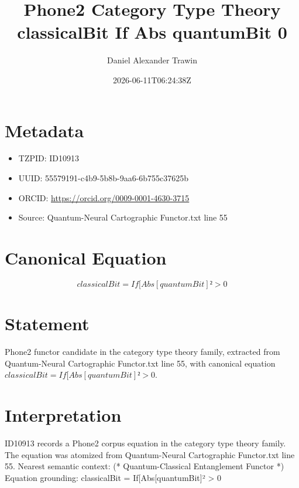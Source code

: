 \documentclass[11pt]{article}
\title{Phone2 Category Type Theory classicalBit If Abs quantumBit 0}
\author{Daniel Alexander Trawin}
\date{2026-06-11T06:24:38Z}
\begin{document}
\maketitle
\section*{Metadata}
\begin{itemize}
\item TZPID: ID10913
\item UUID: 55579191-c4b9-5b8b-9aa6-6b755c37625b
\item ORCID: \url{https://orcid.org/0009-0001-4630-3715}
\item Source: Quantum-Neural Cartographic Functor.txt line 55
\end{itemize}
\section*{Canonical Equation}
\[
classicalBit = If[Abs[quantumBit]² > 0
\]
\section*{Statement}
Phone2 functor candidate in the category type theory family, extracted from Quantum-Neural Cartographic Functor.txt line 55, with canonical equation $classicalBit = If[Abs[quantumBit]² > 0$.
\section*{Interpretation}
ID10913 records a Phone2 corpus equation in the category type theory family. The equation was atomized from Quantum-Neural Cartographic Functor.txt line 55. Nearest semantic context: (* Quantum-Classical Entanglement Functor *) Equation grounding: classicalBit = If[Abs[quantumBit]² > 0
\end{document}
